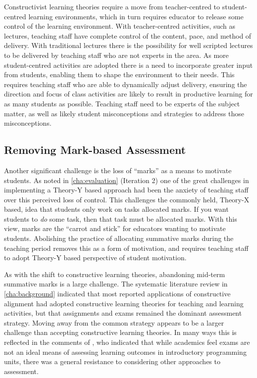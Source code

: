 Constructivist learning theories require a move from teacher-centred to student-centred learning environments, which in turn requires educator to release some control of the learning environment. With teacher-centred activities, such as lectures, teaching staff have complete control of the content, pace, and method of delivery. With traditional lectures there is the possibility for well scripted lectures to be delivered by teaching staff who are not experts in the area. As more student-centred activities are adopted there is a need to incorporate greater input from students, enabling them to shape the environment to their needs. This requires teaching staff who are able to dynamically adjust delivery, ensuring the direction and focus of class activities are likely to result in productive learning for as many students as possible. Teaching staff need to be experts of the subject matter, as well as likely student misconceptions and strategies to address those misconceptions.


\subsection{Removing Mark-based Assessment} %
\label{sub:releasing_control_of_assessment}

Another significant challenge is the loss of ``marks'' as a means to motivate students. As noted in \cref{cha:evaluation} (Iteration 2) one of the great challenges in implementing a Theory-Y based approach had been the anxiety of teaching staff over this perceived loss of control. This challenges the commonly held, Theory-X based, idea that students only work on tasks allocated marks. If you want students to \emph{do} some task, then that task must be allocated marks. With this view, marks are the ``carrot and stick'' for educators wanting to motivate students. Abolishing the practice of allocating summative marks during the teaching period removes this as a form of motivation, and requires teaching staff to adopt Theory-Y based perspective of student motivation.

As with the shift to constructive learning theories, abandoning mid-term summative marks is a large challenge. The systematic literature review in \cref{cha:background} indicated that most reported applications of constructive alignment had adopted constructive learning theories for teaching and learning activities, but that assignments and exams remained the dominant assessment strategy. Moving away from the common strategy appears to be a larger challenge than accepting constructive learning theories. In many ways this is reflected in the comments of \citet{Sheard:2013}, who indicated that while academics feel exams are not an ideal means of assessing learning outcomes in introductory programming units, there was a general resistance to considering other approaches to assessment.

